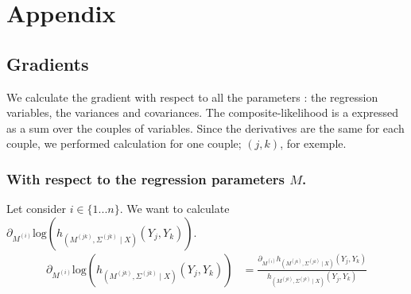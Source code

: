 \documentclass[11pt, a4paper]{article}
\begin{document}
\section{Appendix} \label{appendix}
\subsection{Gradients} \label{grad}
We calculate the gradient with respect to all the parameters : the regression variables, the variances and covariances. The composite-likelihood is a expressed as a sum over the couples of variables. Since the derivatives are the same for each couple, we performed calculation for one couple; $(j,k)$, for exemple.
\subsubsection{With respect to the regression parameters $M$.}
Let consider $i \in \{1...n\}$. We want to calculate $\partial_{M^{(i)}}\mathrm{log}( h_{(M^{(jk)},\Sigma^{(jk)} \mid X)}(Y_j,Y_k))$.
\begin{align*}
\partial_{M^{(i)}}\mathrm{log}( h_{(M^{(jk)},\Sigma^{(jk)} \mid X)}(Y_j,Y_k)) &= \frac{\partial_{M^{(i)}}h_{(M^{(jk)},\Sigma^{(jk)} \mid X)}(Y_j,Y_k) }{h_{(M^{(jk)},\Sigma^{(jk)} \mid X)}(Y_j,Y_k)}
\end{align*}
\end{document}
